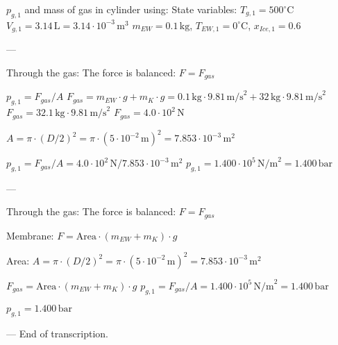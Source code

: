 \( p_{g,1} \) and mass of gas in cylinder using:  
State variables:  
\( T_{g,1} = 500^\circ \text{C} \)  
\( V_{g,1} = 3.14 \, \text{L} = 3.14 \cdot 10^{-3} \, \text{m}^3 \)  
\( m_{EW} = 0.1 \, \text{kg} \), \( T_{EW,1} = 0^\circ \text{C} \), \( x_{Ice,1} = 0.6 \)  

---

Through the gas:  
The force is balanced: \( F = F_{gas} \)  

\( p_{g,1} = F_{gas} / A \)  
\( F_{gas} = m_{EW} \cdot g + m_K \cdot g = 0.1 \, \text{kg} \cdot 9.81 \, \text{m/s}^2 + 32 \, \text{kg} \cdot 9.81 \, \text{m/s}^2 \)  
\( F_{gas} = 32.1 \, \text{kg} \cdot 9.81 \, \text{m/s}^2 \)  
\( F_{gas} = 4.0 \cdot 10^2 \, \text{N} \)  

\( A = \pi \cdot (D/2)^2 = \pi \cdot (5 \cdot 10^{-2} \, \text{m})^2 = 7.853 \cdot 10^{-3} \, \text{m}^2 \)  

\( p_{g,1} = F_{gas} / A = 4.0 \cdot 10^2 \, \text{N} / 7.853 \cdot 10^{-3} \, \text{m}^2 \)  
\( p_{g,1} = 1.400 \cdot 10^5 \, \text{N/m}^2 = 1.400 \, \text{bar} \)  

---

Through the gas:  
The force is balanced:  
\( F = F_{gas} \)  

Membrane:  
\( F = \text{Area} \cdot (m_{EW} + m_K) \cdot g \)  

Area:  
\( A = \pi \cdot (D/2)^2 = \pi \cdot (5 \cdot 10^{-2} \, \text{m})^2 = 7.853 \cdot 10^{-3} \, \text{m}^2 \)  

\( F_{gas} = \text{Area} \cdot (m_{EW} + m_K) \cdot g \)  
\( p_{g,1} = F_{gas} / A = 1.400 \cdot 10^5 \, \text{N/m}^2 = 1.400 \, \text{bar} \)  

\( p_{g,1} = 1.400 \, \text{bar} \)  

---  
End of transcription.